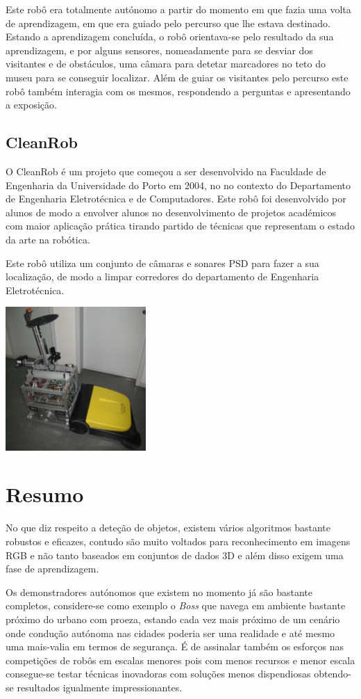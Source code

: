 Este robô era totalmente autónomo a partir do momento em que fazia uma volta de
aprendizagem, em que era guiado pelo percurso que lhe estava destinado. Estando
a aprendizagem concluída, o robô orientava-se pelo resultado da sua aprendizagem,
e por alguns sensores, nomeadamente para se desviar dos visitantes e de obstáculos,
uma câmara para detetar marcadores no teto do museu para se conseguir localizar.
Além de guiar os visitantes pelo percurso este robô também interagia com os mesmos,
respondendo a perguntas e apresentando a exposição.

\subsection{CleanRob}

O CleanRob é um projeto que começou a ser desenvolvido na Faculdade de Engenharia da 
Universidade do Porto em 2004, no no contexto do Departamento de Engenharia
Eletrotécnica e de Computadores. Este robô foi desenvolvido por alunos de modo a
envolver alunos no desenvolvimento de projetos académicos com maior aplicação prática
tirando partido de técnicas que representam o estado da arte na robótica.

Este robô utiliza um conjunto de câmaras e sonares PSD para fazer a sua localização,
de modo a limpar corredores do departamento de Engenharia Eletrotécnica.

\begin{center}
	\includegraphics[width=0.40\textwidth]{./figures/clean_rob.jpg}
	\label{fig:6}
\end{center}


\section{Resumo}

No que diz respeito a deteção de objetos, existem vários algoritmos bastante robustos e
eficazes, contudo são muito voltados para reconhecimento em imagens RGB
e não tanto baseados em conjuntos de dados 3D e além disso exigem uma fase de aprendizagem.

Os demonstradores autónomos que existem no momento já são bastante completos, considere-se
como exemplo o \emph{Boss} que navega em ambiente bastante próximo do urbano com proeza,
estando cada vez mais próximo de um cenário onde condução autónoma nas cidades poderia ser
uma realidade e até mesmo uma mais-valia em termos de segurança. É de assinalar também os esforços
nas competições de robôs em escalas menores pois com menos recursos e menor escala consegue-se
testar técnicas inovadoras com soluções menos dispendiosas obtendo-se resultados igualmente
impressionantes.


